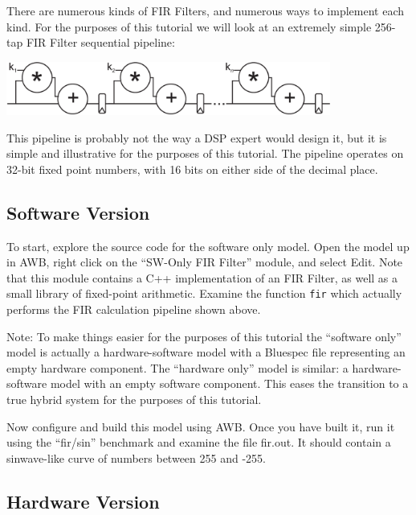 \documentclass{article}
\begin{document}
There are numerous kinds of FIR Filters, and numerous ways to implement each kind. For the purposes of this tutorial we will look at
an extremely simple 256-tap FIR Filter sequential pipeline:

\vspace{10pt}
\begin{centering}

    \includegraphics[width=0.80\textwidth]{FIRFilter.pdf}

\end{centering}

This pipeline is probably not the way a DSP expert would design it, but it is simple and illustrative for the purposes of this
tutorial. The pipeline operates on 32-bit fixed point numbers, with 16 bits on either side of the decimal place.

\subsection{Software Version}

To start, explore the source code for the software only model. Open the model up in AWB, right click on the ``SW-Only FIR Filter''
module, and select Edit. Note that this module contains a C++ implementation of an FIR Filter, as well as a small library of
fixed-point arithmetic. Examine the function \texttt{fir} which actually performs the FIR calculation pipeline shown above.

Note: To make things easier for the purposes of this tutorial the ``software only'' model is actually a hardware-software model with a Bluespec file representing
an empty hardware component. The ``hardware only'' model is similar: a hardware-software model with an empty software component. This eases the transition to a
true hybrid system for the purposes of this tutorial.

Now configure and build this model using AWB. Once you have built it, run it using the ``fir/sin'' benchmark and examine the file fir.out. It should contain a
sinwave-like curve of numbers between 255 and -255.

\subsection{Hardware Version}
\end{document}

